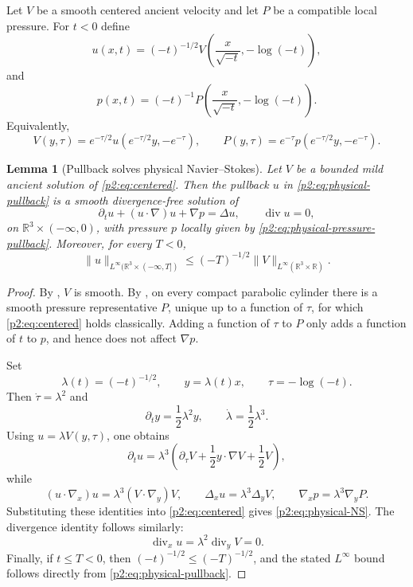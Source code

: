 \documentclass[11pt]{amsart}
\theoremstyle{plain}
\newtheorem{lemma}[lemma]{Lemma}
\theoremstyle{definition}
\theoremstyle{remark}
\numberwithin{equation}{section}
\newcommand{\R}{\mathbb R}
\newcommand{\divergence}{\operatorname{div}}
\begin{document}
Let \(V\) be a smooth centered ancient velocity and let \(P\) be a compatible
local pressure.  For \(t<0\) define
\begin{equation}\label{p2:eq:physical-pullback}
   u(x,t)=(-t)^{-1/2}
   V\left(\frac{x}{\sqrt{-t}},-\log(-t)\right),
\end{equation}
and
\begin{equation}\label{p2:eq:physical-pressure-pullback}
   p(x,t)=(-t)^{-1}
   P\left(\frac{x}{\sqrt{-t}},-\log(-t)\right).
\end{equation}
Equivalently,
\[
   V(y,\tau)=e^{-\tau/2}u(e^{-\tau/2}y,-e^{-\tau}),
   \qquad
   P(y,\tau)=e^{-\tau}p(e^{-\tau/2}y,-e^{-\tau}).
\]

\begin{lemma}[Pullback solves physical Navier--Stokes]
\label{p2:lem:physical-pullback}
Let \(V\) be a bounded mild ancient solution of \eqref{p2:eq:centered}.  Then
the pullback \(u\) in \eqref{p2:eq:physical-pullback} is a smooth divergence-free
solution of
\begin{equation}\label{p2:eq:physical-NS}
   \partial_tu+(u\cdot\nabla)u+\nabla p=\Delta u,
   \qquad \divergence u=0,
\end{equation}
on \(\R^3\times(-\infty,0)\), with pressure \(p\) locally given by
\eqref{p2:eq:physical-pressure-pullback}.  Moreover, for every \(T<0\),
\[
   \|u\|_{L^\infty(\R^3\times(-\infty,T])}
   \le
   (-T)^{-1/2}\|V\|_{L^\infty(\R^3\times\R)}.
\]
\end{lemma}

\begin{proof}
By , \(V\) is smooth.  By
, on every compact parabolic cylinder there is a
smooth pressure representative \(P\), unique up to a function of \(\tau\), for
which \eqref{p2:eq:centered} holds classically.  Adding a function of \(\tau\) to
\(P\) only adds a function of \(t\) to \(p\), and hence does not affect
\(\nabla p\).

Set
\[
   \lambda(t)=(-t)^{-1/2},\qquad
   y=\lambda(t)x,\qquad
   \tau=-\log(-t).
\]
Then \(\dot \tau=\lambda^2\) and
\[
   \partial_t y=\frac12\lambda^2 y,
   \qquad
   \dot\lambda=\frac12\lambda^3 .
\]
Using \(u=\lambda V(y,\tau)\), one obtains
\[
   \partial_tu
   =
   \lambda^3
   \left(
      \partial_\tau V+\frac12y\cdot\nabla V+\frac12V
   \right),
\]
while
\[
   (u\cdot\nabla_x)u=\lambda^3(V\cdot\nabla_y)V,
   \qquad
   \Delta_xu=\lambda^3\Delta_yV,
   \qquad
   \nabla_xp=\lambda^3\nabla_yP .
\]
Substituting these identities into \eqref{p2:eq:centered} gives
\eqref{p2:eq:physical-NS}.  The divergence identity follows similarly:
\[
   \divergence_xu=\lambda^2\divergence_yV=0.
\]
Finally, if \(t\le T<0\), then \((-t)^{-1/2}\le(-T)^{-1/2}\), and the stated
\(L^\infty\) bound follows directly from \eqref{p2:eq:physical-pullback}.
\end{proof}
\end{document}
